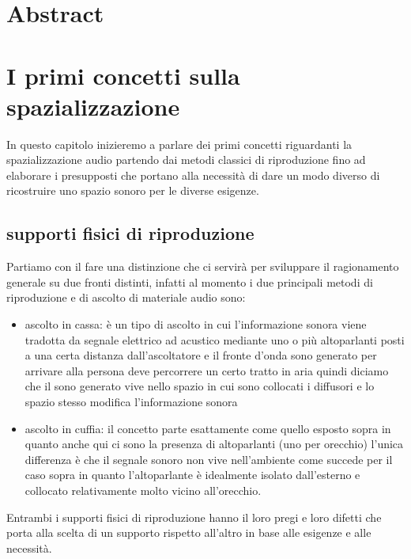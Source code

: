\documentclass[12pt,a4paper]{report}
\begin{document}
\tableofcontents

\listoffigures



\chapter*{Abstract}



\chapter{I primi concetti sulla spazializzazione}

In questo capitolo inizieremo a parlare dei primi concetti riguardanti la spazializzazione audio partendo dai metodi classici di riproduzione fino ad elaborare i presupposti che portano alla necessità di dare un modo diverso di ricostruire uno spazio sonoro per le diverse esigenze.

\section{supporti fisici di riproduzione}

Partiamo con il fare una distinzione che ci servirà per sviluppare il ragionamento generale su due fronti distinti, infatti al momento i due principali metodi di riproduzione e di ascolto di materiale audio sono:

\begin{itemize}
\item ascolto in cassa: è un tipo di ascolto in cui l'informazione sonora viene tradotta da segnale elettrico ad acustico mediante uno o più altoparlanti posti a una certa distanza dall'ascoltatore e il fronte d'onda sono generato per arrivare alla persona deve percorrere un certo tratto in aria quindi diciamo che il sono generato vive nello spazio in cui sono collocati i diffusori e lo spazio stesso modifica l'informazione sonora
\item ascolto in cuffia: il concetto parte esattamente come quello esposto sopra in quanto anche qui ci sono la presenza di altoparlanti (uno per orecchio) l'unica differenza è che il segnale sonoro non vive nell'ambiente come succede per il caso sopra in quanto l'altoparlante è idealmente isolato dall'esterno e collocato relativamente molto vicino all'orecchio.



\end{itemize}
Entrambi i supporti fisici di riproduzione hanno il loro pregi e loro difetti che porta alla scelta di un supporto rispetto all'altro in base alle esigenze e alle necessità.
\end{document}
